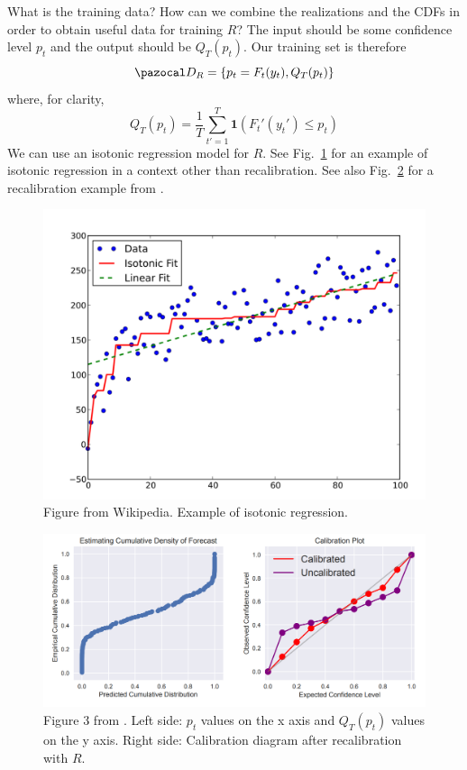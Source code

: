 What is the training data? 
How can we combine the realizations and the CDFs in order to obtain useful data for training $R$? 
The input should be some confidence level $p_t$ and the output should be $Q_T(p_t)$. 
Our training set is therefore
\begin{equation}
	\cD_R = \left\{p_t = F_t(y_t), Q_T(p_t)\right\}
\end{equation}
where, for clarity, 
\begin{equation}
Q_T(p_t) = \frac{1}{T}\sum_{t'=1}^{T}\boldsymbol{1}(F_t'(y_t') \leq p_t)
\end{equation}
We can use an isotonic regression model for $R$.
See Fig.~\ref{fig:isotonic} for an example of isotonic regression in a context other than recalibration. 
See also Fig.~\ref{fig:recalib_reg} for a recalibration example from \textcite{kuleshov2018accurate}.
\begin{figure}[H]
	\centering
	\includegraphics[width=.5\linewidth]{./Figures/isotonic.png}
	\caption{Figure from Wikipedia.
		Example of isotonic regression.}
	\label{fig:isotonic}
\end{figure} 

\begin{figure}[H]
	\centering
	\includegraphics[width=1\linewidth]{./Figures/recalib_reg.png}
	\caption{Figure 3 from \textcite{kuleshov2018accurate}.
	Left side: $p_t$ values on the x axis and $Q_T(p_t)$ values on the y axis. 
	Right side: Calibration diagram after recalibration with $R$.}
	\label{fig:recalib_reg}
\end{figure} 


\newpage	
\printbibliography[heading=bibintoc,title={References}]
	
